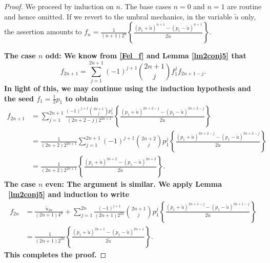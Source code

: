 \documentclass[10pt,a4paper]{amsart}
\begin{document}
\begin{proof} We proceed by induction on $n$. The base cases $n=0$ and $n=1$ are routine and hence omitted.  If we revert to the umbral mechanics, in the variable $\widetilde{u}$ only, the assertion amounts to $f_n=\frac1{(n+1)2^n} \left\{\frac{(p_1+\widetilde{u})^{n+1}-(p_1-\widetilde{u})^{n+1}}{2\widetilde{u}}\right\}$. 

\smallskip

\bf
\noindent The case $n$ odd: \rm We know from \eqref{Fel_f} and Lemma \ref{lm2conj5} that
$$f_{2n+1}= \sum_{j=1}^{2n+1} (-1)^{j+1} \binom{2n+1}j  f_1^j f_{2n+1-j}.$$
 In light of this, we may continue using the induction hypothesis and the seed $f_1=\frac12p_1$ to obtain
\begin{align*}
f_{2n+1} 
& = \sum_{j=1}^{2n+1} \frac{ (-1)^{j+1} \binom{2n+1}j p_1^j}{(2n+2-j)2^{2n+1}} \left\{\frac{(p_1+\widetilde{u})^{2n+2-j}-(p_1-\widetilde{u})^{2n+2-j}}{2\widetilde{u}}\right\}   \\
& = \frac1{(2n+2)2^{2n+1}} \sum_{j=1}^{2n+1} (-1)^{j+1} \binom{2n+2}j p_1^j \left\{\frac{(p_1+\widetilde{u})^{2n+2-j}-(p_1-\widetilde{u})^{2n+2-j}}{2\widetilde{u}}\right\}  \\
& = \frac1{(2n+2)2^{2n+1}} \left\{\frac{(p_1+\widetilde{u})^{2n+2}-(p_1-\widetilde{u})^{2n+2}}{2\widetilde{u}}\right\}.
\end{align*}
\bf The case $n$ even: \rm The argument is similar. We apply Lemma ~\ref{lm2conj5} and induction to write
\begin{align*}
f_{2n} 
& =  \frac{\widetilde{u}_{2n}}{(2n+1)4^n}+ \sum_{j=1}^{2n} \frac{(-1)^{j+1}} {(2n+1)2^{2n}} \binom{2n+1}j p_1^j \left\{\frac{(p_1+\widetilde{u})^{2n+1-j}-(p_1-\widetilde{u})^{2n+1-j}}{2\widetilde{u}}\right\}  \\
& = \frac1{(2n+1)2^{2n}} \left\{\frac{(p_1+\widetilde{u})^{2n+1}-(p_1-\widetilde{u})^{2n+1}}{2\widetilde{u}}\right\}.
\end{align*}
This completes the proof.
\end{proof}
\end{document}
